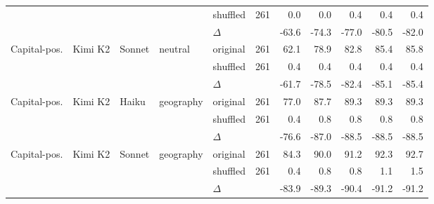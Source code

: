 \begin{table}[h]
\begin{tabular}{l l l l l r r r r r r}
  &     &     &     & shuffled & 261 & 0.0 & 0.0 & 0.4 & 0.4 & 0.4 \\
  &     &     &     & $\Delta$ &  & -63.6 & -74.3 & -77.0 & -80.5 & -82.0 \\
\addlinespace[3pt]
Capital-pos. & Kimi K2 & Sonnet & neutral & original & 261 & 62.1 & 78.9 & 82.8 & 85.4 & 85.8 \\
  &     &     &     & shuffled & 261 & 0.4 & 0.4 & 0.4 & 0.4 & 0.4 \\
  &     &     &     & $\Delta$ &  & -61.7 & -78.5 & -82.4 & -85.1 & -85.4 \\
\addlinespace[3pt]
Capital-pos. & Kimi K2 & Haiku & geography & original & 261 & 77.0 & 87.7 & 89.3 & 89.3 & 89.3 \\
  &     &     &     & shuffled & 261 & 0.4 & 0.8 & 0.8 & 0.8 & 0.8 \\
  &     &     &     & $\Delta$ &  & -76.6 & -87.0 & -88.5 & -88.5 & -88.5 \\
\addlinespace[3pt]
Capital-pos. & Kimi K2 & Sonnet & geography & original & 261 & 84.3 & 90.0 & 91.2 & 92.3 & 92.7 \\
  &     &     &     & shuffled & 261 & 0.4 & 0.8 & 0.8 & 1.1 & 1.5 \\
  &     &     &     & $\Delta$ &  & -83.9 & -89.3 & -90.4 & -91.2 & -91.2 \\
\bottomrule
\end{tabular}
\end{table}
